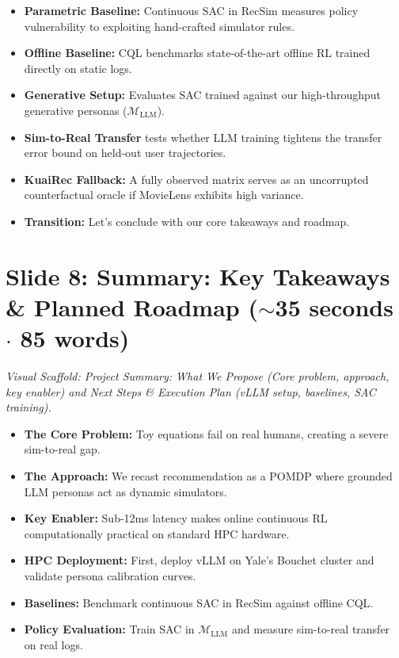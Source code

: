 \documentclass[]{0_aga-homework}
\begin{document}
\begin{itemize}
  \item \textbf{Parametric Baseline:} Continuous SAC in RecSim measures policy vulnerability to exploiting hand-crafted simulator rules.
  \item \textbf{Offline Baseline:} CQL benchmarks state-of-the-art offline RL trained directly on static logs.
  \item \textbf{Generative Setup:} Evaluates SAC trained against our high-throughput generative personas ($\mathcal{M}_{\text{LLM}}$).
  \item \textbf{Sim-to-Real Transfer} tests whether LLM training tightens the transfer error bound on held-out user trajectories.
  \item \textbf{KuaiRec Fallback:} A fully observed matrix serves as an uncorrupted counterfactual oracle if MovieLens exhibits high variance.
  \item \textbf{Transition:} Let's conclude with our core takeaways and roadmap.
\end{itemize}

\section*{Slide 8: Summary: Key Takeaways \& Planned Roadmap ($\sim$35 seconds $\cdot$ 85 words)}
\noindent\textit{Visual Scaffold: Project Summary: What We Propose (Core problem, approach, key enabler) and Next Steps \& Execution Plan (vLLM setup, baselines, SAC training).}

\begin{itemize}
  \item \textbf{The Core Problem:} Toy equations fail on real humans, creating a severe sim-to-real gap.
  \item \textbf{The Approach:} We recast recommendation as a POMDP where grounded LLM personas act as dynamic simulators.
  \item \textbf{Key Enabler:} Sub-12ms latency makes online continuous RL computationally practical on standard HPC hardware.
  \item \textbf{HPC Deployment:} First, deploy vLLM on Yale's Bouchet cluster and validate persona calibration curves.
  \item \textbf{Baselines:} Benchmark continuous SAC in RecSim against offline CQL.
  \item \textbf{Policy Evaluation:} Train SAC in $\mathcal{M}_{\text{LLM}}$ and measure sim-to-real transfer on real logs.
\end{itemize}
\end{document}
